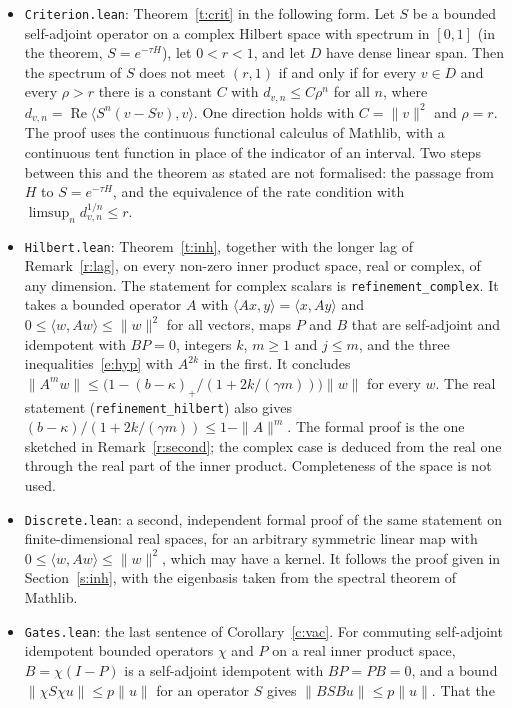 \begin{itemize}
\item \texttt{Criterion.lean}: Theorem~\ref{t:crit} in the following form. Let $S$ be a bounded self-adjoint
operator on a complex Hilbert space with spectrum in $[0,1]$ (in the theorem, $S=e^{-\tau H}$), let $0<r<1$,
and let $D$ have dense linear span. Then the spectrum of $S$ does not meet $(r,1)$ if and only if for every
$v\in D$ and every $\rho>r$ there is a constant $C$ with $d_{v,n}\le C\rho^n$ for all $n$, where
$d_{v,n}=\operatorname{Re}\langle S^n(v-Sv),v\rangle$. One direction holds with $C=\|v\|^2$ and $\rho=r$. The
proof uses the continuous functional calculus of Mathlib, with a continuous tent function in place of the
indicator of an interval. Two steps between this and the theorem as stated are not formalised: the passage
from $H$ to $S=e^{-\tau H}$, and the equivalence of the rate condition with
$\limsup_nd_{v,n}^{1/n}\le r$.
\item \texttt{Hilbert.lean}: Theorem~\ref{t:inh}, together with the longer lag of Remark~\ref{r:lag}, on
every non-zero inner product space, real or complex, of any dimension. The statement for complex scalars is
\texttt{refinement\_complex}. It takes a bounded operator $A$ with
$\langle Ax,y\rangle=\langle x,Ay\rangle$ and $0\le\langle w,Aw\rangle\le\|w\|^2$ for all vectors, maps $P$ and
$B$ that are self-adjoint and idempotent with $BP=0$, integers $k$, $m\ge1$ and $j\le m$, and the three
inequalities~\eqref{e:hyp} with $A^{2k}$ in the first. It concludes
$\|A^mw\|\le\big(1-(b-\kappa)_+/(1+2k/(\gamma m))\big)\|w\|$ for every $w$. The real statement
(\texttt{refinement\_hilbert}) also gives $(b-\kappa)/(1+2k/(\gamma m))\le1-\|A\|^m$. The formal proof is the
one sketched in Remark~\ref{r:second}; the complex case is deduced from the real one through the real part
of the inner product. Completeness of the space is not used.
\item \texttt{Discrete.lean}: a second, independent formal proof of the same statement on finite-dimensional
real spaces, for an arbitrary symmetric linear map with $0\le\langle w,Aw\rangle\le\|w\|^2$, which may have a
kernel. It follows the proof given in Section~\ref{s:inh}, with the eigenbasis taken from the spectral
theorem of Mathlib.
\item \texttt{Gates.lean}: the last sentence of Corollary~\ref{c:vac}. For commuting self-adjoint idempotent
bounded operators $\chi$ and $P$ on a real inner product space, $B=\chi(I-P)$ is a self-adjoint idempotent
with $BP=PB=0$, and a bound $\|\chi S\chi u\|\le p\|u\|$ for an operator $S$ gives $\|BSBu\|\le p\|u\|$. That the

\end{itemize}

